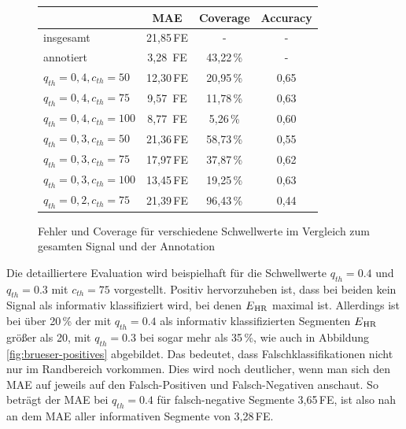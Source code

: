   \begin{figure}[H] %
  
 	\centering
 	\begin{tabular}{l || c | c | c}
 									& \ac{MAE}			& Coverage		& Accuracy\\ \hline
 		insgesamt 					& 21{,}85\,\si{FE}	& -				& - \\
 		annotiert					& 3{,}28	\,\si{FE}	& 43{,}22\,\%	& - \\ \hline
 		$q_{th}=0{,}4, c_{th}=50$	& 12{,}30\,\si{FE}	& 20{,}95\,\%	& 0{,}65\\
 		$q_{th}=0{,}4, c_{th}=75$	& 9{,}57	\,\si{FE}	& 11{,}78\,\%	& 0{,}63\\
 		$q_{th}=0{,}4, c_{th}=100$	& 8{,}77	\,\si{FE}	& 5{,}26\,\%		& 0{,}60\\ \hline
 		$q_{th}=0{,}3, c_{th}=50$	& 21{,}36\,\si{FE}	& 58{,}73\,\%	& 0{,}55\\
 		$q_{th}=0{,}3, c_{th}=75$	& 17{,}97\,\si{FE}	& 37{,}87\,\%	& 0{,}62\\
 		$q_{th}=0{,}3, c_{th}=100$	& 13{,}45\,\si{FE}	& 19{,}25\,\%	& 0{,}63\\ \hline
 		$q_{th}=0{,}2, c_{th}=75$	& 21{,}39\,\si{FE}	& 96{,}43\,\%	& 0{,}44\\
 	\end{tabular}
 	\caption[Fehler und Coverage der Klassifikation nach der Ähnlichkeit der Intervallschätzer des CLIE-Algorithmus für verschiedene Schwellwerte im Vergleich zum gesamten Signal und der Annotation]{Fehler und Coverage für verschiedene Schwellwerte im Vergleich zum gesamten Signal und der Annotation}
 	\label{fig:brueser-sqi-MAE-Coverage}
 	\end{figure}
 	
 Die detailliertere Evaluation wird beispielhaft für die Schwellwerte $q_{th} = 0.4$ und $q_{th} = 0.3$ mit $c_{th}=75$ vorgestellt. Positiv hervorzuheben ist, dass bei beiden kein Signal als informativ klassifiziert wird, bei denen $E\textsubscript{HR}$ maximal ist. Allerdings ist bei über 20\,\% der mit $q_{th} = 0.4$ als informativ klassifizierten Segmenten $E\textsubscript{HR}$ größer als 20, mit $q_{th} = 0.3$ bei sogar mehr als 35\,\%, wie auch in Abbildung \ref{fig:brueser-positives} abgebildet. Das bedeutet, dass Falschklassifikationen nicht nur im Randbereich vorkommen. Dies wird noch deutlicher, wenn man sich den \ac{MAE} auf jeweils auf den Falsch-Positiven und Falsch-Negativen anschaut. So beträgt der \ac{MAE} bei $q_{th} = 0.4$ für falsch-negative Segmente 3,65\,\si{FE}, ist also nah an dem \ac{MAE} aller informativen Segmente von 3,28\,\si{FE}.
 
